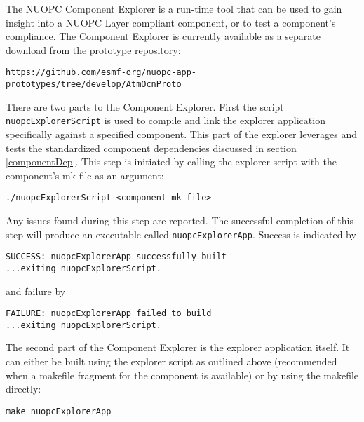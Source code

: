 %

\label{Explorer}

The NUOPC Component Explorer is a run-time tool that can be used to gain insight into a NUOPC Layer compliant component, or to test a component's compliance. The Component Explorer is currently available as a separate download from the prototype repository:

\begin{verbatim}
https://github.com/esmf-org/nuopc-app-prototypes/tree/develop/AtmOcnProto
\end{verbatim}

There are two parts to the Component Explorer. First the script {\tt nuopcExplorerScript} is used to compile and link the explorer application specifically against a specified component. This part of the explorer leverages and tests the standardized component dependencies discussed in section \ref{componentDep}. This step is initiated by calling the explorer script with the component's mk-file as an argument:

\begin{verbatim}
./nuopcExplorerScript <component-mk-file>
\end{verbatim}

Any issues found during this step are reported. The successful completion of this step will produce an executable called {\tt nuopcExplorerApp}. Success is indicated by 

\begin{verbatim}
SUCCESS: nuopcExplorerApp successfully built
...exiting nuopcExplorerScript.
\end{verbatim}

and failure by

\begin{verbatim}
FAILURE: nuopcExplorerApp failed to build
...exiting nuopcExplorerScript.
\end{verbatim}

The second part of the Component Explorer is the explorer application itself. It can either be built using the explorer script as outlined above (recommended when a makefile fragment for the component is available) or by using the makefile directly:

\begin{verbatim}
make nuopcExplorerApp
\end{verbatim}

